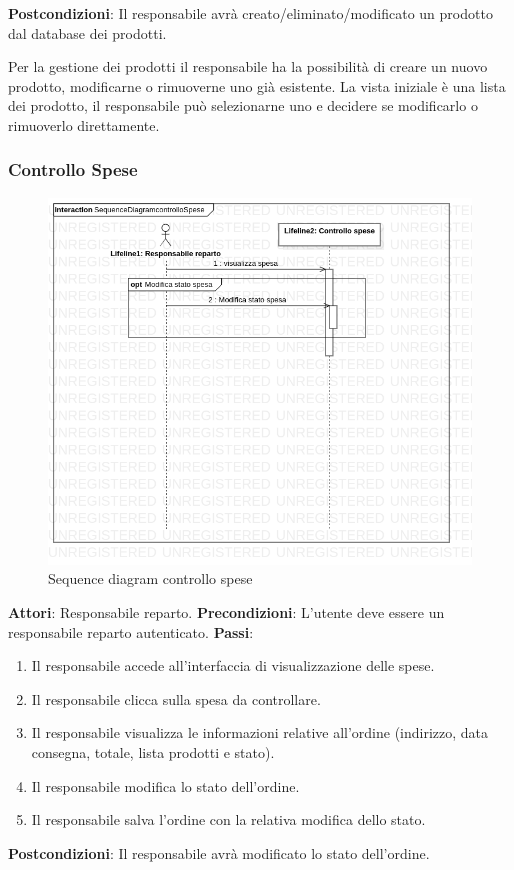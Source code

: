 \documentclass[12pt, a4paper]{report}
\begin{document}
\textbf{Postcondizioni}: Il responsabile avrà creato/eliminato/modificato un prodotto dal database dei prodotti.
\break

Per la gestione dei prodotti il responsabile ha la possibilità di creare un
nuovo prodotto, modificarne o rimuoverne uno già esistente. La vista iniziale è
una lista dei prodotto, il responsabile può selezionarne uno e decidere se
modificarlo o rimuoverlo direttamente.\newpage

\subsubsection{Controllo Spese}

\begin{figure}[h]
  \centering
  \includegraphics[width=\textwidth]{Use Case Model!Controllo spese!InteractionConstrolloSpese!SequenceDiagramcontrolloSpese_11.png}
  \caption{Sequence diagram controllo spese}
\end{figure}
\break
\textbf{Attori}: Responsabile reparto.\newline
\textbf{Precondizioni}: L'utente deve essere un responsabile reparto autenticato. \newline
\textbf{Passi}: 
\begin{enumerate}
\item Il responsabile accede all'interfaccia di visualizzazione delle spese.
\item Il responsabile clicca sulla spesa da controllare.
\item Il responsabile visualizza le informazioni relative all'ordine (indirizzo, data consegna, totale, lista prodotti e stato). 
\item Il responsabile modifica lo stato dell'ordine.
\item Il responsabile salva l'ordine con la relativa modifica dello stato.
\end{enumerate}
\textbf{Postcondizioni}: Il responsabile avrà modificato lo stato dell'ordine.
\break
\end{document}
